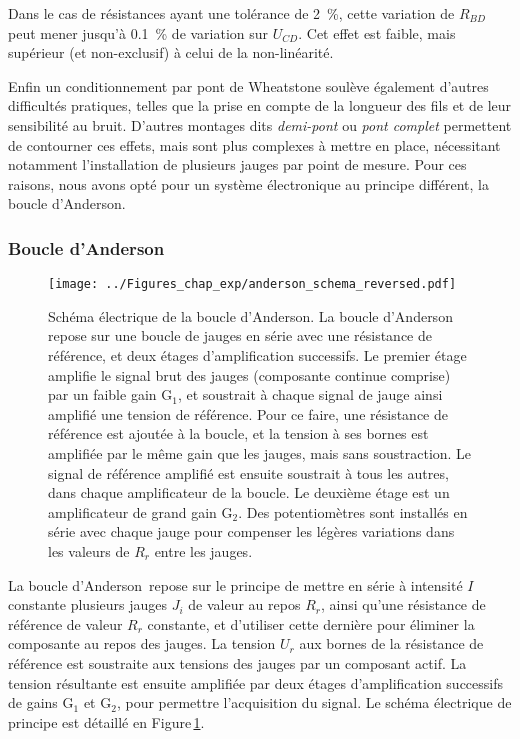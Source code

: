 Dans le cas de résistances ayant une tolérance de \SI{2}{\percent}, cette variation de $R_{BD}$ peut mener jusqu'à \SI{0.1}{\percent} de variation sur $U_{CD}$. Cet effet est faible, mais supérieur (et non-exclusif) à celui de la non-linéarité.


Enfin un conditionnement par pont de Wheatstone soulève également d'autres difficultés pratiques, telles que la prise en compte de la longueur des fils et de leur sensibilité au bruit. D'autres montages dits \textit{demi-pont} ou \textit{pont complet} permettent de contourner ces effets, mais sont plus complexes à mettre en place, nécessitant notamment l'installation de plusieurs jauges par point de mesure. Pour ces raisons, nous avons opté pour un système électronique au principe différent, la boucle d'Anderson.

\subsubsection{Boucle d'Anderson}
\label{sec:anderson}

\begin{figure}[htb]
\centering	
\texttt{[image: ../Figures\_chap\_exp/anderson\_schema\_reversed.pdf]}
\caption[Boucle d'Anderson]{Schéma électrique de la boucle d'Anderson. La boucle d'Anderson repose sur une boucle de jauges en série avec une résistance de référence, et deux étages d'amplification successifs. Le premier étage amplifie le signal brut des jauges (composante continue comprise) par un faible gain $\mathrm{G}_1$, et soustrait à chaque signal de jauge ainsi amplifié une tension de référence. Pour ce faire, une résistance de référence est ajoutée à la boucle, et la tension à ses bornes est amplifiée par le même gain que les jauges, mais sans soustraction. Le signal de référence amplifié est ensuite soustrait à tous les autres, dans chaque amplificateur de la boucle. Le deuxième étage est un amplificateur de grand gain $\mathrm{G}_2$. Des potentiomètres sont installés en série avec chaque jauge pour compenser les légères variations dans les valeurs de $R_r$ entre les jauges.}
\label{fig:anderson}
\end{figure}





La boucle d'Anderson\,\cite{anderson_nasas_1998} repose sur le principe de mettre en série à intensité $I$ constante plusieurs jauges $J_i$ de valeur au repos $R_r$, ainsi qu'une résistance de référence de valeur $R_r$ constante, et d'utiliser cette dernière pour éliminer la composante au repos des jauges. La tension $U_r$ aux bornes de la résistance de référence est soustraite aux tensions des jauges par un composant actif. La tension résultante est ensuite amplifiée par deux étages d'amplification successifs de gains $\mathrm{G}_1$ et $\mathrm{G}_2$, pour permettre l'acquisition du signal. Le schéma électrique de principe est détaillé en Figure\,\ref{fig:anderson}.




